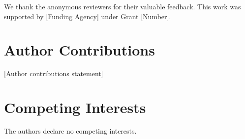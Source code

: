 \documentclass[journal]{IEEEtran}
\begin{document}
We thank the anonymous reviewers for their valuable feedback. This work was supported by [Funding Agency] under Grant [Number].

\section*{Author Contributions}

[Author contributions statement]

\section*{Competing Interests}

The authors declare no competing interests.



\end{document}
